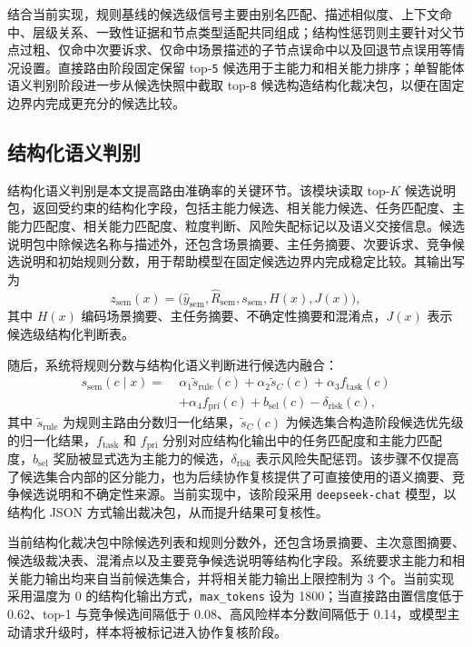 \documentclass[10pt,a4paper,twocolumn,fontset=fandol]{ctexart}
\begin{document}
结合当前实现，规则基线的候选级信号主要由别名匹配、描述相似度、上下文命中、层级关系、一致性证据和节点类型适配共同组成；结构性惩罚则主要针对父节点过粗、仅命中次要诉求、仅命中场景描述的子节点误命中以及回退节点误用等情况设置。直接路由阶段固定保留 top-\texttt{5} 候选用于主能力和相关能力排序；单智能体语义判别阶段进一步从候选快照中截取 top-\texttt{8} 候选构造结构化裁决包，以便在固定边界内完成更充分的候选比较。

\subsection{结构化语义判别}

结构化语义判别是本文提高路由准确率的关键环节。该模块读取 top-$K$ 候选说明包，返回受约束的结构化字段，包括主能力候选、相关能力候选、任务匹配度、主能力匹配度、相关能力匹配度、粒度判断、风险失配标记以及语义交接信息。候选说明包中除候选名称与描述外，还包含场景摘要、主任务摘要、次要诉求、竞争候选说明和初始规则分数，用于帮助模型在固定候选边界内完成稳定比较。其输出写为
\begin{equation}
z_{\mathrm{sem}}(x)=\bigl(\hat y_{\mathrm{sem}},\hat R_{\mathrm{sem}},s_{\mathrm{sem}},H(x),J(x)\bigr),
\end{equation}
其中 $H(x)$ 编码场景摘要、主任务摘要、不确定性摘要和混淆点，$J(x)$ 表示候选级结构化判断表。

随后，系统将规则分数与结构化语义判断进行候选内融合：
\begin{equation}
\begin{aligned}
s_{\mathrm{sem}}(c\mid x)=\;&\alpha_1 \widetilde s_{\mathrm{rule}}(c)
+\alpha_2 \widetilde s_C(c)
+\alpha_3 f_{\mathrm{task}}(c)\\
&+\alpha_4 f_{\mathrm{pri}}(c)
+b_{\mathrm{sel}}(c)
-\delta_{\mathrm{risk}}(c),
\end{aligned}
\end{equation}
其中 $\widetilde s_{\mathrm{rule}}$ 为规则主路由分数归一化结果，$\widetilde s_C(c)$ 为候选集合构造阶段候选优先级的归一化结果，$f_{\mathrm{task}}$ 和 $f_{\mathrm{pri}}$ 分别对应结构化输出中的任务匹配度和主能力匹配度，$b_{\mathrm{sel}}$ 奖励被显式选为主能力的候选，$\delta_{\mathrm{risk}}$ 表示风险失配惩罚。该步骤不仅提高了候选集合内部的区分能力，也为后续协作复核提供了可直接使用的语义摘要、竞争候选说明和不确定性来源。当前实现中，该阶段采用 \texttt{deepseek-chat} 模型，以结构化 JSON 方式输出裁决包，从而提升结果可复核性。

当前结构化裁决包中除候选列表和规则分数外，还包含场景摘要、主次意图摘要、候选级裁决表、混淆点以及主要竞争候选说明等结构化字段。系统要求主能力和相关能力输出均来自当前候选集合，并将相关能力输出上限控制为 3 个。当前实现采用温度为 0 的结构化输出方式，\texttt{max\_tokens} 设为 1800；当直接路由置信度低于 0.62、top-1 与竞争候选间隔低于 0.08、高风险样本分数间隔低于 0.14，或模型主动请求升级时，样本将被标记进入协作复核阶段。
\end{document}
